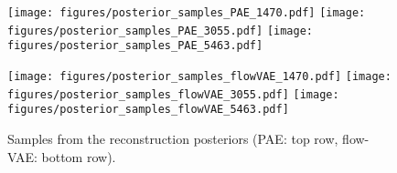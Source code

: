 \documentclass[10pt]{article} \usepackage[accepted]{tmlr}
\begin{document}
\begin{figure}
\texttt{[image: figures/posterior\_samples\_PAE\_1470.pdf]}
\texttt{[image: figures/posterior\_samples\_PAE\_3055.pdf]}
\texttt{[image: figures/posterior\_samples\_PAE\_5463.pdf]}

\texttt{[image: figures/posterior\_samples\_flowVAE\_1470.pdf]}
\texttt{[image: figures/posterior\_samples\_flowVAE\_3055.pdf]}
\texttt{[image: figures/posterior\_samples\_flowVAE\_5463.pdf]}

\caption{Samples from the reconstruction posteriors (PAE: top row, flow-VAE: bottom row).  
\label{fig:post_samples}}
\end{figure}
\end{document}
